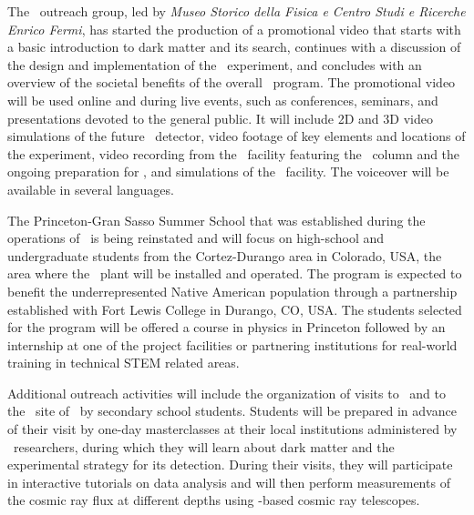 The \GADMC\ outreach group, led by {\it Museo Storico della Fisica e Centro Studi e Ricerche Enrico Fermi}, has started the production of a promotional video that starts with a basic introduction to dark matter and its search, continues with a discussion of the design and implementation of the \DSks\ experiment, and concludes with an overview of the societal benefits of the overall \GADMC\ program.  The promotional video will be used online and during live events, such as conferences, seminars, and presentations devoted to the general public.  It will include 2D and 3D video simulations of the future \DSks\ detector, video footage of key elements and locations of the experiment, video recording from the \Aria\ facility featuring the \SeruciZero\ column and the ongoing preparation for \SeruciOne, and simulations of the \Urania\ facility.  The voiceover will be available in several languages.

The Princeton-Gran Sasso Summer School that was established during the operations of \DSf\ is being reinstated and will focus on high-school and undergraduate students from the Cortez-Durango area in Colorado, USA, the area where the \Urania\ plant will be installed and operated.  The program is expected to benefit the underrepresented Native American population through a partnership established with Fort Lewis College in Durango, CO, USA.  The students selected for the program will be offered a course in physics in Princeton followed by an internship at one of the project facilities or partnering institutions for real-world training in technical STEM related areas.

Additional outreach activities will include the organization of visits to \LNGS\ and to the \Seruci\ site of \Aria\ by secondary school students. Students will be prepared in advance of their visit by one-day masterclasses at their local institutions administered by \GADMC\ researchers, during which they will learn about dark matter and the experimental strategy for its detection.  During their visits, they will participate in interactive tutorials on data analysis and will then perform measurements of the cosmic ray flux at different depths using \SiPM-based cosmic ray telescopes.
